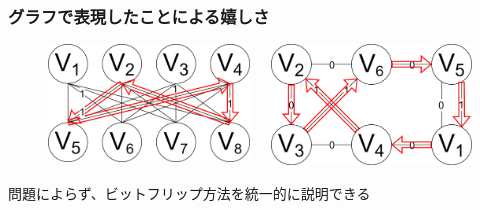 \begin{frame}
  \frametitle{グラフで表現したことによる嬉しさ}
  \begin{figure}
    \begin{columns}
      \begin{column}{0.47\linewidth}
        \includegraphics[width=1\linewidth]{data/kanzen2ji_path.png}     
      \end{column}
      \begin{column}{0.47\linewidth}
        \includegraphics[width=1\linewidth]{data/2ji_path.png}
      \end{column}
    \end{columns}
  \end{figure}
  \centering
  問題によらず、ビットフリップ方法を統一的に説明できる
\end{frame}

